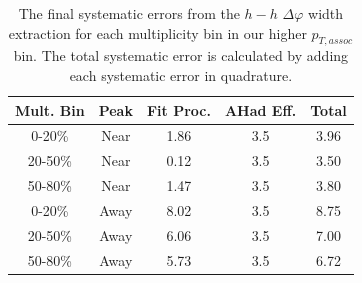 \documentclass[ALICE,manyauthors]{ALICE_analysis_notes}
\begin{document}
\begin{table}[ht]
\centering
\begin{tabular}{|c|c||c|c||c|}
\hline
Mult. Bin & Peak & Fit Proc. & AHad Eff. & Total \\
\hline
0-20\% & Near & 1.86 & 3.5 & 3.96 \\
20-50\% & Near & 0.12 & 3.5 & 3.50 \\
50-80\% & Near & 1.47 & 3.5 & 3.80 \\
0-20\% & Away & 8.02 & 3.5 & 8.75 \\
20-50\% & Away & 6.06 & 3.5 & 7.00 \\
50-80\% & Away & 5.73 & 3.5 & 6.72 \\
\hline
\end{tabular}
\caption{The final systematic errors from the $h-h$ $\Delta\varphi$ width extraction  for each multiplicity bin in our higher $p_{T, assoc}$ bin. The total systematic error is calculated by adding each systematic error in quadrature.}
\label{h_h_width_systematic_table_highpt}
\end{table}
\end{document}
